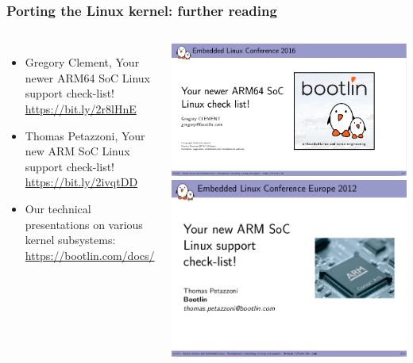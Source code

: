 \begin{frame}
  \frametitle{Porting the Linux kernel: further reading}
  \begin{columns}
    \begin{itemize}
    \item Gregory Clement, Your newer ARM64 SoC Linux support check-list!\\
          \url{https://bit.ly/2r8lHnE}
    \item Thomas Petazzoni, Your new ARM SoC Linux support check-list!\\
          \url{https://bit.ly/2ivqtDD}
    \item Our technical presentations on various kernel subsystems:\\
          \url{https://bootlin.com/docs/}
    \end{itemize}
    \includegraphics[height=0.35\textheight]{slides/kernel-porting-content/arm64-soc-support-checklist.png}\\
    \includegraphics[height=0.35\textheight]{slides/kernel-porting-content/arm-soc-support-checklist.png}
  \end{columns}
\end{frame}
